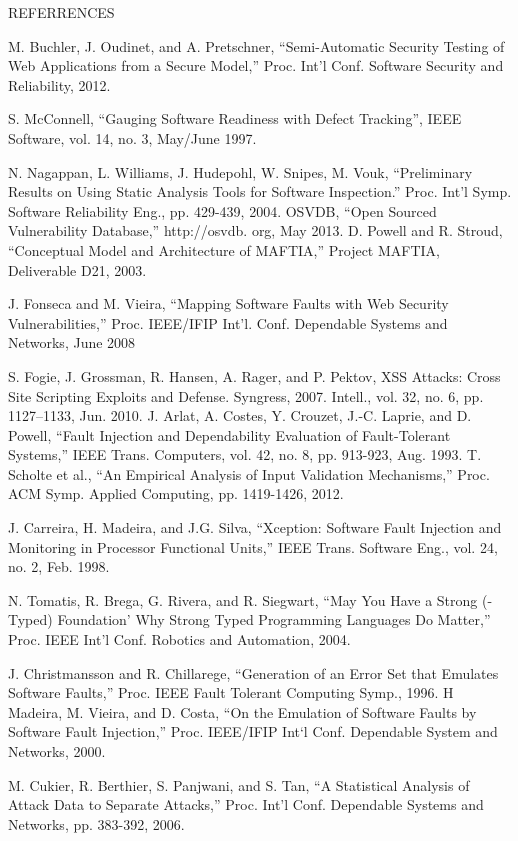 \documentclass[xcolor=x11names,compress]{beamer}
\renewcommand{\(}{\begin{columns}}
\renewcommand{\)}{\end{columns}}
\newcommand{\<}[1]{\begin{column}{#1}}
\renewcommand{\>}{\end{column}}
\begin{document}
\begin{frame}[allowframebreaks]{REFERRENCES}
\begin{thebibliography}{8}
	M. Buchler, J. Oudinet, and A. Pretschner,  ``Semi-Automatic Security Testing of Web Applications from a Secure Model,'' Proc. Int’l
	Conf. Software Security and Reliability, 2012.
	
	S. McConnell, ``Gauging Software Readiness with Defect
	Tracking'', IEEE Software, vol. 14, no. 3, May/June 1997.
	
	N. Nagappan, L. Williams, J. Hudepohl, W. Snipes, M. Vouk,
	``Preliminary Results on Using Static Analysis Tools for Software
	Inspection.'' Proc. Int’l Symp. Software Reliability Eng., pp. 429-439,
	2004.
	OSVDB,  ``Open Sourced Vulnerability Database,'' http://osvdb.
	org, May 2013.
	D. Powell and R. Stroud,  ``Conceptual Model and Architecture of
	MAFTIA,'' Project MAFTIA, Deliverable D21, 2003.
	
	J. Fonseca and M. Vieira,  ``Mapping Software Faults with Web
	Security Vulnerabilities,'' Proc. IEEE/IFIP Int’l. Conf. Dependable
	Systems and Networks, June 2008
	
	S. Fogie, J. Grossman, R. Hansen, A. Rager, and P. Pektov, XSS
	Attacks: Cross Site Scripting Exploits and Defense. Syngress, 2007.
	Intell., vol. 32, no. 6, pp. 1127–1133, Jun. 2010.
	J. Arlat, A. Costes, Y. Crouzet, J.-C. Laprie, and D. Powell,  ``Fault
	Injection and Dependability Evaluation of Fault-Tolerant Systems,'' IEEE Trans. Computers, vol. 42, no. 8, pp. 913-923, Aug.
	1993.
	T. Scholte et al.,  ``An Empirical Analysis of Input Validation
	Mechanisms,'' Proc. ACM Symp. Applied Computing, pp. 1419-1426,
	2012.
	
	J. Carreira, H. Madeira, and J.G. Silva,  ``Xception: Software Fault
	Injection and Monitoring in Processor Functional Units,'' IEEE
	Trans. Software Eng., vol. 24, no. 2, Feb. 1998.
	
	N. Tomatis, R. Brega, G. Rivera, and R. Siegwart,  ``May You Have
	a Strong (-Typed) Foundation’ Why Strong Typed Programming
	Languages Do Matter,'' Proc. IEEE Int’l Conf. Robotics and
	Automation, 2004.
	
	J. Christmansson and R. Chillarege,  ``Generation of an Error Set
	that Emulates Software Faults,'' Proc. IEEE Fault Tolerant Computing Symp., 1996.
	H Madeira, M. Vieira, and D. Costa,  ``On the Emulation of Software Faults by Software Fault Injection,'' Proc. IEEE/IFIP Int‘l
	Conf. Dependable System and Networks, 2000.
	
	M. Cukier, R. Berthier, S. Panjwani, and S. Tan,  ``A Statistical
	Analysis of Attack Data to Separate Attacks,'' Proc. Int’l Conf.
	Dependable Systems and Networks, pp. 383-392, 2006.
	
\end{thebibliography}
\end{frame}
\begin{frame}
\end{frame}
\end{document}
